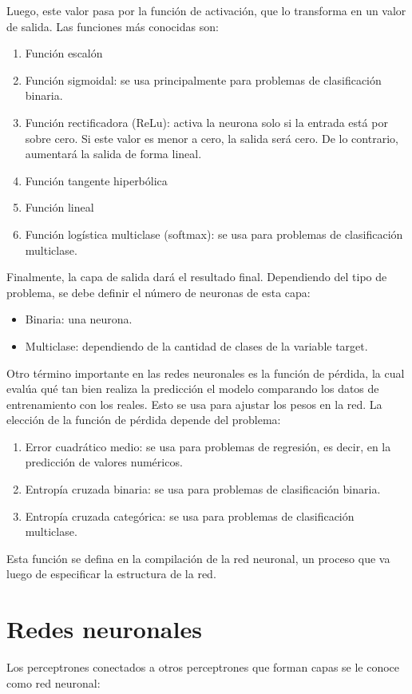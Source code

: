 \documentclass[a4paper, 12pt]{book}
\begin{document}
Luego, este valor pasa por la función de activación, que lo transforma en un valor de salida. Las funciones más conocidas son:
\begin{enumerate}
	\item Función escalón
	\item Función sigmoidal: se usa principalmente para problemas de clasificación binaria.
	\item Función rectificadora (ReLu): activa la neurona solo si la entrada está por sobre cero. Si este valor es menor a cero, la salida será cero. De lo contrario, aumentará la salida de forma lineal.
	\item Función tangente hiperbólica
	\item Función lineal
	\item Función logística multiclase (softmax): se usa para problemas de clasificación multiclase.
\end{enumerate}

Finalmente, la capa de salida dará el resultado final. Dependiendo del tipo de problema, se debe definir el número de neuronas de esta capa:
\begin{itemize}
	\item Binaria: una neurona.
	\item Multiclase: dependiendo de la cantidad de clases de la variable target.
\end{itemize}

Otro término importante en las redes neuronales es la función de pérdida, la cual evalúa qué tan bien realiza la predicción el modelo comparando los datos de entrenamiento con los reales. Esto se usa para ajustar los pesos en la red. La elección de la función de pérdida depende del problema:
\begin{enumerate}
	\item Error cuadrático medio: se usa para problemas de regresión, es decir, en la predicción de valores numéricos.
	\item Entropía cruzada binaria: se usa para problemas de clasificación binaria.
	\item Entropía cruzada categórica: se usa para problemas de clasificación multiclase.
\end{enumerate}
Esta función se defina en la compilación de la red neuronal, un proceso que va luego de especificar la estructura de la red.
\section{Redes neuronales}
Los perceptrones conectados a otros perceptrones que forman capas se le conoce como red neuronal:
\end{document}
